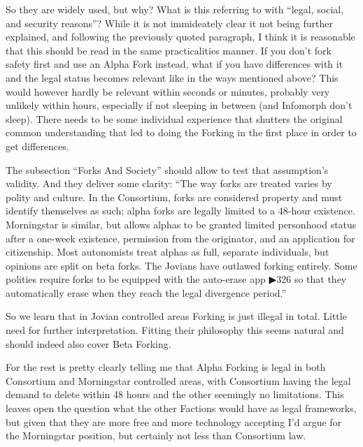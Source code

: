 So they are widely used, but why? What is this referring to with “legal, social, and security reasons”? While it is not immideately clear it not being further explained, and following the previously quoted paragraph, I think it is reasonable that this should be read in the same practicalities manner. If you don't fork safety first and use an Alpha Fork instead, what if you have differences with it and the legal status becomes relevant like in the ways mentioned above? This would however hardly be relevant within seconds or minutes, probably very unlikely within hours, especially if not sleeping in between (and Infomorph don't sleep). There needs to be some individual experience that shutters the original common understanding that led to doing the Forking in the first place in order to get differences.

The subsection “Forks And Society” should allow to test that assumption's validity. And they deliver some clarity: “The way forks are treated varies by polity and culture. In the Consortium, forks are considered property and must identify themselves as such; alpha forks are legally limited to a 48-hour existence. Morningstar is similar, but allows alphas to be granted limited personhood status after a one-week existence, permission from the originator, and an application for citizenship. Most autonomists treat alphas as full, separate individuals, but opinions are split on beta forks. The Jovians have outlawed forking entirely. Some polities require forks to be equipped with the auto-erase app ▶326 so that they automatically erase when they reach the legal divergence period.”

So we learn that in Jovian controlled areas Forking is just illegal in total. Little need for further interpretation. Fitting their philosophy this seems natural and should indeed also cover Beta Forking.

For the rest is pretty clearly telling me that Alpha Forking is legal in both Consortium and Morningstar controlled areas, with Consortium having the legal demand to delete within 48 hours and the other seemingly no limitations. This leaves open the question what the other Factions would have as legal frameworks, but given that they are more free and more technology accepting I'd argue for the Morningstar position, but certainly not less than Consortium law.

